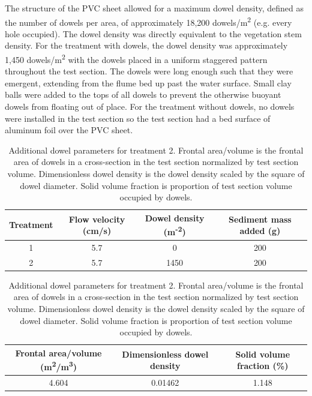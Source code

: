 \documentclass[12pt]{article}
\begin{document}
The structure of the PVC sheet allowed for a maximum dowel density, defined as the number of dowels per area, of approximately 18,200 dowels/m\textsuperscript{2} (e.g. every hole occupied). The dowel density was directly equivalent to the vegetation stem density. For the treatment with dowels, the dowel density was approximately 1,450 dowels/m\textsuperscript{2} with the dowels placed in a uniform staggered pattern throughout the test section. The dowels were long enough such that they were emergent, extending from the flume bed up past the water surface. Small clay balls were added to the tops of all dowels to prevent the otherwise buoyant dowels from floating out of place. For the treatment without dowels, no dowels were installed in the test section so the test section had a bed surface of aluminum foil over the PVC sheet.

\begin{table}[H]
    \caption{Experiment settings and parameters}
    \begin{subtable}{1\textwidth}
        \caption{Summary of key experiment settings for all treatments. The only variable is the presence or absence of dowels in the test section. All numeric values are averages across the relevant spatial scale.}
        \label{tab_experimentsettings}
        \centering
        \begin{tabular}{c c c c}
            \textbf{Treatment} & \textbf{Flow velocity} (cm/s) & \textbf{Dowel density} (m\textsuperscript{-2}) & \textbf{Sediment mass added} (g) \\
            \hline
            1 & 5.7 & 0 & 200 \\
            \hline
            2 & 5.7 & 1450 & 200 \\
            \hline
        \end{tabular}
    \end{subtable}
    \newline
    \vspace*{0.1 in}
    \newline
    \begin{subtable}{1\textwidth}
        \caption{Additional dowel parameters for treatment 2. Frontal area/volume is the frontal area of dowels in a cross-section in the test section normalized by test section volume. Dimensionless dowel density is the dowel density scaled by the square of dowel diameter. Solid volume fraction is proportion of test section volume occupied by dowels.}
        \label{tab_dowelparameters}
        \centering
        \begin{tabular}{c c c}
            \textbf{Frontal area/volume} (m\textsuperscript{2}/m\textsuperscript{3}) & \textbf{Dimensionless dowel density} & \textbf{Solid volume fraction} (\%) \\
            \hline
            4.604 & 0.01462 & 1.148 \\
            \hline
        \end{tabular}
    \end{subtable}
\end{table}
\end{document}
